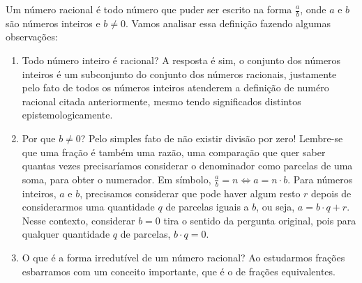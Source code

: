 Um número racional é todo número que puder ser escrito na forma $\displaystyle\frac{a}{b}$, onde $a$ e $b$ são números inteiros e $b \neq 0$. Vamos analisar essa definição fazendo algumas observações:
\begin{enumerate}
\item {} 
Todo número inteiro é racional? A resposta é sim, o conjunto dos números inteiros é um subconjunto do conjunto dos números racionais, justamente pelo fato de todos os números inteiros atenderem a definição de numéro racional citada anteriormente, mesmo tendo significados distintos epistemologicamente.

\item {} 
Por que $b \neq 0$?  Pelo simples fato de não existir divisão por zero! Lembre-se que uma fração é também uma razão, uma comparação que quer saber quantas vezes precisaríamos considerar o denominador como parcelas de uma soma, para obter o numerador. Em símbolo, $\displaystyle\frac{a}{b}=n \Leftrightarrow a = n \cdot b$. Para números inteiros, $a$ e $b$, precisamos considerar que pode haver algum resto $r$ depois de considerarmos uma quantidade $q$ de parcelas iguais a $b$, ou seja, $a = b \cdot q + r$. Nesse contexto, considerar $b=0$ tira o sentido da pergunta original, pois para qualquer quantidade $q$ de parcelas, $b\cdot q = 0$.

\item {} 
O que é a forma irredutível de um número racional? Ao estudarmos frações esbarramos com um conceito importante, que é o de frações equivalentes.

\end{enumerate}

